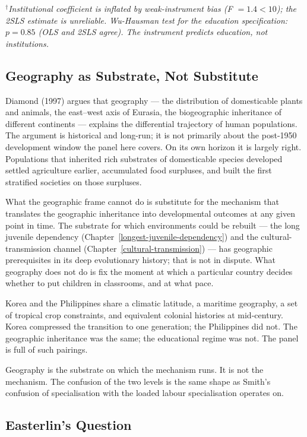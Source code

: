 \documentclass[12pt,letterpaper]{article}
\begin{document}
{\emph{$^{\dagger}$Institutional coefficient is inflated by weak-instrument
bias (F $= 1.4 < 10$); the 2SLS estimate is unreliable.
Wu-Hausman test for the education specification: $p = 0.85$ (OLS and 2SLS
agree). The instrument predicts education, not institutions.}

\subsection{Geography as Substrate, Not Substitute}\label{geography-as-substrate-not-substitute}

Diamond (1997) argues that geography --- the distribution of domesticable plants and animals, the east--west axis of Eurasia, the biogeographic inheritance of different continents --- explains the differential trajectory of human populations. The argument is historical and long-run; it is not primarily about the post-1950 development window the panel here covers. On its own horizon it is largely right. Populations that inherited rich substrates of domesticable species developed settled agriculture earlier, accumulated food surpluses, and built the first stratified societies on those surpluses.

What the geographic frame cannot do is substitute for the mechanism that translates the geographic inheritance into developmental outcomes at any given point in time. The substrate for which environments could be rebuilt --- the long juvenile dependency (Chapter~\ref{longest-juvenile-dependency}) and the cultural-transmission channel (Chapter~\ref{cultural-transmission}) --- has geographic prerequisites in its deep evolutionary history; that is not in dispute. What geography does not do is fix the moment at which a particular country decides whether to put children in classrooms, and at what pace.

Korea and the Philippines share a climatic latitude, a maritime geography, a set of tropical crop constraints, and equivalent colonial histories at mid-century. Korea compressed the transition to one generation; the Philippines did not. The geographic inheritance was the same; the educational regime was not. The panel is full of such pairings.

Geography is the substrate on which the mechanism runs. It is not the mechanism. The confusion of the two levels is the same shape as Smith's confusion of specialisation with the loaded labour specialisation operates on.

\subsection{Easterlin's Question}\label{easterlins-question}

}
\end{document}

